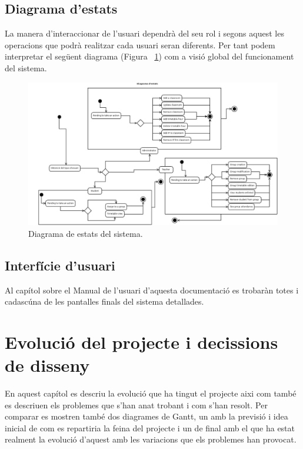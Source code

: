 \documentclass[a4paper]{report}  %
\begin{document}
\section{Diagrama d'estats}
La manera d'interaccionar de l'usuari dependrà del seu rol i segons aquest les operacions que podrà realitzar cada usuari seran diferents. Per tant podem interpretar el següent diagrama (Figura ~\ref{fig:DiagramaEstats-rf}) com a visió global del funcionament del sistema.
		\begin{figure}[H] %
		\begin{center}
		\includegraphics[width=14cm,keepaspectratio]{img/DiagramaEstats-rf.jpg}
		\caption[List caption]{Diagrama de estats del sistema.}
		\label{fig:DiagramaEstats-rf}
		\end{center}
		\end{figure}
\section{Interfície d'usuari}
Al capítol sobre el Manual de l'usuari d'aquesta documentació es trobaràn totes i cadascúna de les pantalles finals del sistema detallades.
\chapter{Evolució del projecte i decissions de disseny}
En aquest capítol es descriu la evolució que ha tingut el projecte aixi com també es descriuen els problemes que s'han anat trobant i com s'han resolt. 
Per comparar es mostren també dos diagrames de Gantt, un amb la previsió i idea inicial de com es repartiria la feina del projecte i un de final amb el que ha estat realment la evolució d'aquest amb les variacions que els problemes han provocat. 
\end{document}
